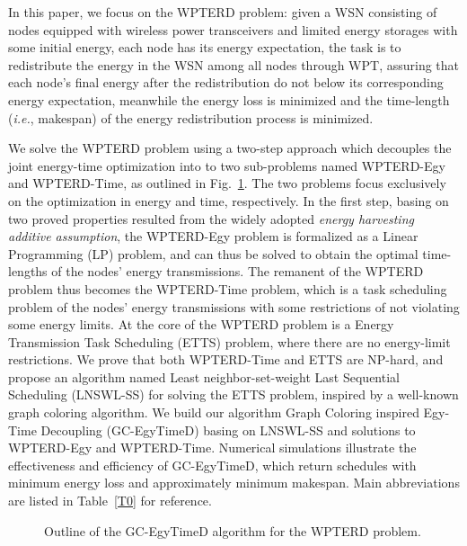 \documentclass[journal,10pt]{IEEEtran}
\begin{document}
In this paper, we focus on the WPTERD problem: given a WSN consisting of nodes equipped with wireless power transceivers and limited energy storages with some initial energy, each node has its energy expectation, the task is to redistribute the energy in the WSN among all nodes through WPT, assuring that each node's final energy after the redistribution do not below its corresponding energy expectation, meanwhile the energy loss is minimized and the time-length (\textit{i.e.}, makespan) of the energy redistribution process is minimized.


We solve the WPTERD problem using a two-step approach which decouples the joint energy-time optimization into to two sub-problems named WPTERD-Egy and WPTERD-Time, as outlined in Fig.~\ref{fig_outline}. The two problems focus exclusively on the optimization in energy and time, respectively. In the first step, basing on two proved properties resulted from the widely adopted \textit{energy harvesting additive assumption}, the WPTERD-Egy problem is formalized as a Linear Programming (LP) problem, and can thus be solved to obtain the optimal time-lengths of the nodes' energy transmissions. The remanent of the WPTERD problem thus becomes the WPTERD-Time problem, which is a task scheduling problem of the nodes' energy transmissions with some restrictions of not violating some energy limits. At the core of the WPTERD problem is a Energy Transmission Task Scheduling (ETTS) problem, where there are no energy-limit restrictions. We prove that both WPTERD-Time and ETTS are NP-hard, and propose an algorithm named Least neighbor-set-weight Last Sequential Scheduling (LNSWL-SS) for solving the ETTS problem, inspired by a well-known graph coloring algorithm. We build our algorithm Graph Coloring inspired Egy-Time Decoupling (GC-EgyTimeD) basing on LNSWL-SS and solutions to WPTERD-Egy and WPTERD-Time. Numerical simulations illustrate the effectiveness and efficiency of GC-EgyTimeD, which return schedules with minimum energy loss and approximately minimum makespan. Main abbreviations are listed in Table~\ref{T0} for reference.

\begin{figure}[htb]
\caption{Outline of the GC-EgyTimeD algorithm for the WPTERD problem.}
\label{fig_outline}
\end{figure}
\end{document}
